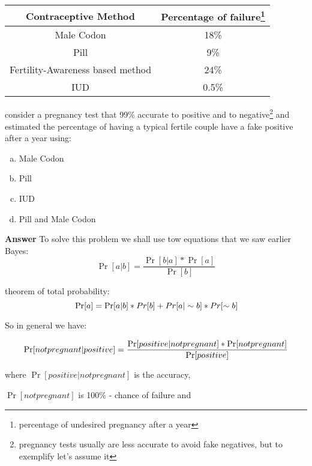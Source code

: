 \documentclass{book}
\begin{document}
    \begin{center}
     \begin{tabular}{||c | c||} 
     \hline
     Contraceptive Method & Percentage of failure\footnote{percentage of undesired pregnancy after a year} \\ [0.9ex] 
     \hline\hline
     Male Codon & 18\% \\ 
    \hline
    Pill & 9\% \\ 
    \hline
    Fertility-Awareness based method & 24\% \\ 
    \hline
    IUD & 0.5\% \\
    \hline
    \end{tabular}
    \end{center}
    consider a pregnancy test that 99\% accurate to positive and to negative\footnote{pregnancy tests usually are less accurate to avoid fake negatives, but to exemplify let's assume it}  and estimated the percentage of having a typical fertile couple have a fake positive after a year using:
    \begin{enumerate}[(a)]
        \item Male Codon
        \item Pill
        \item IUD
        \item Pill and Male Codon
    \end{enumerate}
    


\textbf{Answer}
To solve this problem we shall use tow equations that we saw earlier
\large{Bayes: }
\begin{equation*}
 \Pr[a|b]=\frac{\Pr[b|a]*\Pr[a]}{\Pr[b]}
\end{equation*}


 \large{theorem of total probability:}
\begin{equation*}
    \\ \Pr[a]=\Pr[a|b]*Pr[b]+Pr[a|\sim b]*Pr[\sim b]
\end{equation*}

So in general we have:

\begin{equation*}
    \large{\Pr[not pregnant| positive]=\frac{\Pr[positive|not pregnant]*\Pr[not pregnant]}{\Pr[positive]}}
\end{equation*}

where $\Pr[positive|not pregnant]$  is  the  accuracy,

$\Pr[not pregnant]$ is 100\% - chance of failure and 
\end{document}

